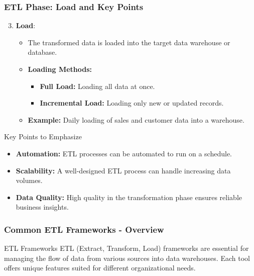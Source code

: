 \documentclass{beamer}
\begin{document}
\begin{frame}[fragile]
    \frametitle{ETL Phase: Load and Key Points}
    \begin{enumerate}
        \setcounter{enumi}{2} %
        \item \textbf{Load}:
        \begin{itemize}
            \item The transformed data is loaded into the target data warehouse or database.
            \item \textbf{Loading Methods:}
            \begin{itemize}
                \item \textbf{Full Load:} Loading all data at once.
                \item \textbf{Incremental Load:} Loading only new or updated records.
            \end{itemize}
            \item \textbf{Example:} Daily loading of sales and customer data into a warehouse.
        \end{itemize}
    \end{enumerate}

    \begin{block}{Key Points to Emphasize}
        \begin{itemize}
            \item \textbf{Automation:} ETL processes can be automated to run on a schedule.
            \item \textbf{Scalability:} A well-designed ETL process can handle increasing data volumes.
            \item \textbf{Data Quality:} High quality in the transformation phase ensures reliable business insights.
        \end{itemize}
    \end{block}
\end{frame}

\begin{frame}[fragile]
    \frametitle{Common ETL Frameworks - Overview}
    \begin{block}{ETL Frameworks}
        ETL (Extract, Transform, Load) frameworks are essential for managing the flow of data from various sources into data warehouses. Each tool offers unique features suited for different organizational needs.
    \end{block}
\end{frame}
\end{document}
